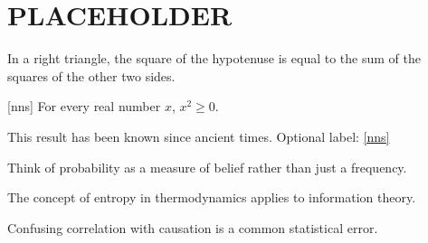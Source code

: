 \chapter{PLACEHOLDER}

\lipsum[1-10]


\begin{theorem} 
    In a right triangle, the square of the hypotenuse is equal to the sum of the squares of the other two sides.
    \end{theorem}
    
    \begin{lemma} [nns]
    For every real number $x$, $x^2 \geq 0$.
    \end{lemma}
    
    \begin{remark}
    This result has been known since ancient times. Optional label: \ref{nns}
    \end{remark}
    
    \begin{intuition}[Probability]
    Think of probability as a measure of belief rather than just a frequency.
    \end{intuition}
    
    \begin{wormhole}[Entropy]
    The concept of entropy in thermodynamics applies to information theory.
    \end{wormhole}
    
    \begin{fallacy}
    Confusing correlation with causation is a common statistical error.
    \end{fallacy}